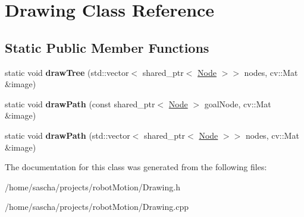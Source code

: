 \hypertarget{class_drawing}{\section{Drawing Class Reference}
\label{class_drawing}
}
\subsection*{Static Public Member Functions}
\begin{DoxyCompactItemize}
\item 
\hypertarget{class_drawing_a0424b6844e0bf30bcf248773453f7123}{static void {\bfseries draw\-Tree} (std\-::vector$<$ shared\-\_\-ptr$<$ \hyperlink{class_node}{Node} $>$$>$ nodes, cv\-::\-Mat \&image)}\label{class_drawing_a0424b6844e0bf30bcf248773453f7123}

\item 
\hypertarget{class_drawing_a896c9788ad5a710eb165b748620e1734}{static void {\bfseries draw\-Path} (const shared\-\_\-ptr$<$ \hyperlink{class_node}{Node} $>$ goal\-Node, cv\-::\-Mat \&image)}\label{class_drawing_a896c9788ad5a710eb165b748620e1734}

\item 
\hypertarget{class_drawing_afca6f3612209b700c6953a2ade8da045}{static void {\bfseries draw\-Path} (std\-::vector$<$ shared\-\_\-ptr$<$ \hyperlink{class_node}{Node} $>$$>$ nodes, cv\-::\-Mat \&image)}\label{class_drawing_afca6f3612209b700c6953a2ade8da045}

\end{DoxyCompactItemize}


The documentation for this class was generated from the following files\-:\begin{DoxyCompactItemize}
\item 
/home/sascha/projects/robot\-Motion/Drawing.\-h\item 
/home/sascha/projects/robot\-Motion/Drawing.\-cpp\end{DoxyCompactItemize}

